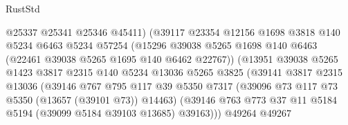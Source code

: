\begin{lexlean}{RustStd}
\begin{coremodule}
                                    @25337
                                    @25341
                                    @25346
                                    @45411)
                                  (@39117
                                    @23354
                                    @12156
                                    @1698
                                    @3818
                                    @140
                                    @5234
                                    @6463
                                    @5234
                                    @57254
                                    (@15296
                                      @39038
                                      @5265
                                      @1698
                                      @140
                                      @6463
                                      (@22461 @39038 @5265 @1695 @140 @6462 @22767))
                                    (@13951
                                      @39038
                                      @5265
                                      @1423
                                      @3817
                                      @2315
                                      @140
                                      @5234
                                      @13036
                                      @5265
                                      @3825
                                      (@39141
                                        @3817
                                        @2315
                                        @13036
                                        (@39146
                                          @767
                                          @795
                                          @117
                                          @39
                                          @5350
                                          @7317
                                          (@39096 @73 @117 @73 @5350 (@13657 (@39101 @73)) @14463)
                                          (@39146
                                            @763
                                            @773
                                            @37
                                            @11
                                            @5184
                                            @5194
                                            (@39099 @5184 @39103 @13685)
                                            @39163)))
                                      @49264
                                      @49267

\end{coremodule}
\end{lexlean}
